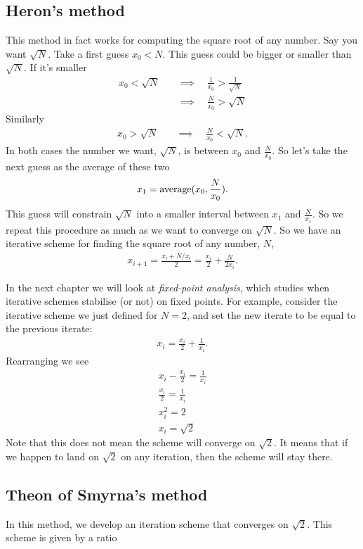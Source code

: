\subsection{Heron's method}
This method in fact works for computing the square root of any number. Say you want $\sqrt{N}$. Take a first guess $x_0 < N$. This guess could be bigger or smaller than $\sqrt{N}$. If it's smaller
\begin{align}
x_0 < \sqrt{N} \quad & \implies \quad \frac{1}{x_0} > \frac{1}{\sqrt{N}} \\
& \implies \quad \frac{N}{x_0} > \sqrt{N}
\end{align}
Similarly
\begin{align}
x_0 > \sqrt{N} \quad & \implies \quad \frac{N}{x_0} < \sqrt{N}.
\end{align}
In both cases the number we want, $\sqrt{N}$, is between $x_0$ and $\frac{N}{x_0}$. So let's take the next guess as the average of these two
\begin{align}
x_1 = {\rm average}(x_0, \frac{N}{x_0}).
\end{align}
This guess will constrain $\sqrt{N}$ into a smaller interval between $x_1$ and $\frac{N}{x_1}$. So we repeat this procedure as much as we want to converge on $\sqrt{N}$. So we have an iterative scheme for finding the square root of any number, $N$,
\begin{align}
x_{i+1} = \frac{x_i + N/x_i}{2} = \frac{x_i}{2} + \frac{N}{2x_i}.
\end{align}

In the next chapter we will look at \textit{fixed-point analysis}, which studies when iterative schemes stabilise (or not) on fixed points. For example, consider the iterative scheme we just defined for $N=2$, and set the new iterate to be equal to the previous iterate:
\begin{align}
x_i = \frac{x_i}{2} + \frac{1}{x_i}.
\end{align}
Rearranging we see
\begin{align}
x_i - \frac{x_i}{2} = \frac{1}{x_i} \\
\frac{x_i}{2} = \frac{1}{x_i} \\
x_i^2 = 2\\
x_i = \sqrt{2}
\end{align}
Note that this does not mean the scheme will converge on $\sqrt{2}$. It means that if we happen to land on $\sqrt{2}$ on any iteration, then the scheme will stay there.




\subsection{Theon of Smyrna's method}
In this method, we develop an iteration scheme that converges on $\sqrt{2}$. This scheme is given by a ratio

